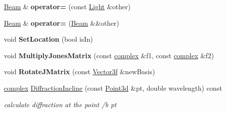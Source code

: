 \begin{DoxyCompactItemize}
\item 
\mbox{\label{class_beam_a3e1cf69d3a76b5adcab75c5d8b9073d4}} 
\mbox{\hyperlink{class_beam}{Beam}} \& {\bfseries operator=} (const \mbox{\hyperlink{class_light}{Light}} \&other)
\item 
\mbox{\label{class_beam_af5dbd7b4282b858982753eac9872c741}} 
\mbox{\hyperlink{class_beam}{Beam}} \& {\bfseries operator=} (\mbox{\hyperlink{class_beam}{Beam}} \&\&other)
\item 
\mbox{\label{class_beam_a26b413c65c1040a843bd438e68728ca7}} 
void {\bfseries Set\+Location} (bool is\+In)
\item 
\mbox{\label{class_beam_a2213010326ea833a80eb7c611559a1bb}} 
void {\bfseries Multiply\+Jones\+Matrix} (const \mbox{\hyperlink{classcomplex}{complex}} \&f1, const \mbox{\hyperlink{classcomplex}{complex}} \&f2)
\item 
\mbox{\label{class_beam_a65280f7435acc8fb35cc704293254d48}} 
void {\bfseries Rotate\+J\+Matrix} (const \mbox{\hyperlink{struct_point3f}{Vector3f}} \&new\+Basis)
\item 
\mbox{\label{class_beam_ad8f6c8517bddffd413410aa8ee5b8ad2}} 
\mbox{\hyperlink{classcomplex}{complex}} \mbox{\hyperlink{class_beam_ad8f6c8517bddffd413410aa8ee5b8ad2}{Diffraction\+Incline}} (const \mbox{\hyperlink{struct_point3d}{Point3d}} \&pt, double wavelength) const
\begin{DoxyCompactList}\small\item\em calculate diffraction at the point /b pt \end{DoxyCompactList}\end{DoxyCompactItemize}
